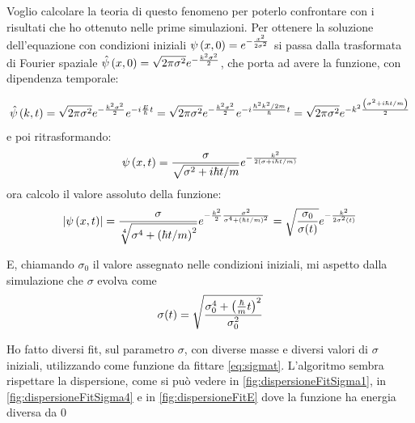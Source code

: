 Voglio calcolare la teoria di questo fenomeno per poterlo confrontare con i risultati che ho ottenuto nelle prime simulazioni.
Per ottenere la soluzione dell'equazione con condizioni iniziali $\psi\lrt{x,0}=e^{-\frac{x^2}{2\sigma^2}}$ si passa dalla trasformata di Fourier spaziale $\hat\psi\lrt{x,0}=\sqrt{2\pi\sigma^2} e^{-\frac{k^2 \sigma^2}2}$, che porta ad avere la funzione, con dipendenza temporale:

\begin{equation}
  \hat{\psi}\lrt{k,t} = \sqrt{2\pi\sigma^2} e^{-\frac{k^2 \sigma^2}2} e^{-i\frac E\hbar t} =
  \sqrt{2\pi\sigma^2} e^{-\frac{k^2 \sigma^2}2} e^{-i\frac {\hbar^2 k^2/2m}\hbar t} = 
  \sqrt{2\pi\sigma^2} e^{-k^2\frac{\lrt{\sigma^2+i\hbar t/m}}2 }
\end{equation}
e poi ritrasformando:
\begin{equation}
  \psi\lrt{x,t} = \frac{\sigma}{\sqrt{\sigma^2 + i\hbar t /m}}
  e^{-\frac{k^2}{2\lrt{\sigma + i\hbar t/m}}}
\end{equation}
ora calcolo il valore assoluto della funzione:
\begin{equation}
  \lr||{\psi\lrt{x,t}} = \frac{\sigma}{\sqrt[4]{\sigma^4 + \lrt{\hbar t /m}^2}}
  e^{-\frac{k^2}2\frac{\sigma^2}{\sigma^4 + \lrt{\hbar t /m}^2}} = \sqrt{\frac{\sigma_0}{\sigma(t)}}e^{-\frac{k^2}{2\sigma^2(t)}}
\end{equation}

E, chiamando $\sigma_0$ il valore assegnato nelle condizioni iniziali, mi aspetto dalla simulazione che $\sigma$ evolva come
\begin{equation}\label{eq:sigmat}
  \sigma(t) = \sqrt{\frac{\sigma_0^4+\lrt{\frac\hbar m t}^2}{\sigma_0^2}}
\end{equation}

Ho fatto diversi fit, sul parametro $\sigma$, con diverse masse e diversi valori di $\sigma$ iniziali, utilizzando come funzione da fittare \eqref{eq:sigmat}. L'algoritmo sembra rispettare la dispersione,  come si pu\`o vedere in \autoref{fig:dispersioneFitSigma1}, in
\autoref{fig:dispersioneFitSigma4} e in \autoref{fig:dispersioneFitE} dove la funzione ha energia diversa da 0

